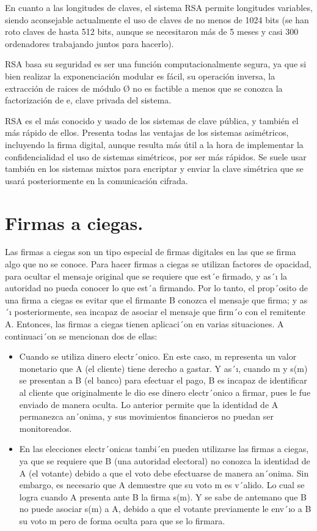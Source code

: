 En cuanto a las longitudes de claves, el sistema RSA permite longitudes variables, siendo aconsejable actualmente el uso de claves de no menos de 1024 bits (se han roto claves de hasta 512 bits, aunque se necesitaron más de 5 meses y casi 300 ordenadores trabajando juntos para hacerlo).

RSA basa su seguridad es ser una función computacionalmente segura, ya que si bien realizar la exponenciación modular es fácil, su operación inversa, la extracción de raices de módulo Ø no es factible a menos que se conozca la factorización de e, clave privada del sistema.

RSA es el más conocido y usado de los sistemas de clave pública, y también el más rápido de ellos. Presenta todas las ventajas de los sistemas asimétricos, incluyendo la firma digital, aunque resulta más útil a la hora de implementar la confidencialidad el uso de sistemas simétricos, por ser más rápidos. Se suele usar también en los sistemas mixtos para encriptar y enviar la clave simétrica que se usará posteriormente en la comunicación cifrada. ~\cite{rsa}

\section{Firmas a ciegas. }

Las firmas a ciegas son un tipo especial de firmas digitales en las que se firma algo que no se conoce. Para hacer firmas a ciegas se utilizan factores de opacidad, para ocultar el mensaje original que se requiere que est´e firmado, y as´ı la autoridad no pueda conocer lo que est´a firmando.
Por lo tanto, el prop´osito de una firma a ciegas es evitar que el firmante B conozca el mensaje que firma; y as´ı posteriormente, sea incapaz de asociar el mensaje que firm´o con el remitente A. Entonces, las firmas a ciegas tienen aplicaci´on en varias situaciones. A continuaci´on se mencionan dos de ellas:
\begin{itemize}
	\item Cuando se utiliza dinero electr´onico. En este caso, m representa un valor monetario que A (el cliente) tiene derecho a gastar. Y as´ı, cuando m y s(m) se presentan a B (el banco) para efectuar el pago, B es incapaz de identificar al cliente que originalmente le dio ese dinero electr´onico a firmar, pues le fue enviado de manera oculta. Lo anterior permite que la identidad de A 	permanezca an´onima, y sus movimientos financieros no puedan ser monitoreados.
	\item En las elecciones electr´onicas tambi´en pueden utilizarse las firmas a ciegas, ya que se requiere que B (una autoridad electoral) no conozca la identidad de A (el votante) debido a que el voto debe efectuarse de manera an´onima. Sin embargo, es necesario que A demuestre que su voto m es v´alido. Lo cual se logra cuando A presenta ante B la firma s(m). Y se sabe de antemano que B no puede asociar s(m) a A, debido a que el votante previamente le env´ıo a B su voto m pero de forma oculta para que se lo firmara. ~\cite{ciegas}
\end{itemize} 

